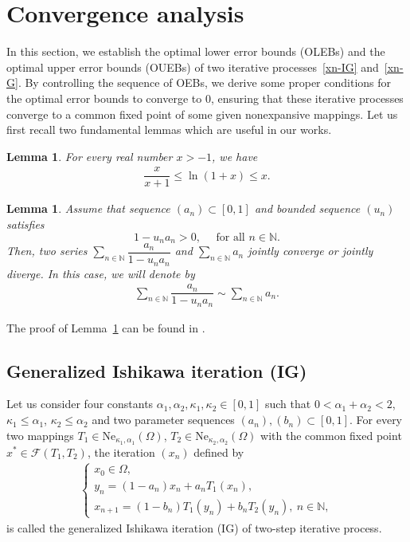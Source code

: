 \documentclass[a4paper, 11pt]{article}
\newtheorem{lemma}[theorem]{Lemma}
\begin{document}
	
\section{Convergence analysis} \label{Sec3}
In this section, we establish the optimal lower error bounds (OLEBs) and the optimal upper error bounds (OUEBs) of two iterative processes~\eqref{xn-IG} and~\eqref{xn-G}. By controlling the sequence of OEBs, we derive some proper conditions for the optimal error bounds to converge to 0, ensuring that these iterative processes converge to a common fixed point of some given nonexpansive mappings. Let us first recall two fundamental lemmas which are useful in our works.
\begin{lemma}\label{lem1}
For every real number $x > -1$, we have 
\begin{align}\label{ln-ineq}
\dfrac{x}{x+1} \le \ln(1+ x) \le x.
\end{align}
\end{lemma}
		
\begin{lemma}\label{lem2}
Assume that sequence $(a_n) \subset [0, 1]$ and bounded sequence $(u_n)$  satisfies 
$$1 - u_na_n > 0, \quad \mbox{ for all } n\in \mathbb{N}.$$ 
Then, two series $\displaystyle \sum_{n \in \mathbb{N}} \dfrac{a_n}{1- u_na_n}$ and $\displaystyle \sum_{n \in \mathbb{N}} a_n$ jointly converge or jointly diverge. In this case, we will denote by
\begin{align*}
\sum_{n \in \mathbb{N}} \dfrac{a_n}{1- u_na_n} \sim \sum_{n \in \mathbb{N}} a_n.
\end{align*}
\end{lemma}
The proof of Lemma~\ref{lem2} can be found in \cite[Lemma 2.7]{paper2}.
		
\subsection{Generalized Ishikawa iteration (IG)}
		
Let us consider four constants $\alpha_1, \alpha_2, \kappa_1, \kappa_2 \in [0, 1]$ such that $0 < \alpha_1 + \alpha_2 < 2$, $\kappa_1 \le \alpha_1$, $\kappa_2 \le \alpha_2$ and two parameter sequences $(a_n), (b_n) \subset [0, 1]$. For every two mappings $T_1 \in \text{Ne}_{\kappa_1, \alpha_1}(\Omega)$, $T_2 \in \text{Ne}_{\kappa_2, \alpha_2}(\Omega)$ with the common fixed point $x^* \in \mathcal{F}(T_1, T_2)$, the iteration $(x_n)$ defined by
		\begin{align}\tag{IG}\label{xn-IG}
			\begin{cases} x_0 \in \Omega,\\ y_{n} = (1-a_n)x_n + a_nT_1(x_n), \\ x_{n+1} = (1-b_n)T_1(y_n) + b_nT_2(y_n), \ n \in \mathbb{N}, \end{cases}
		\end{align}
		is called the generalized Ishikawa iteration (IG) of two-step iterative process.
		
\end{document}

